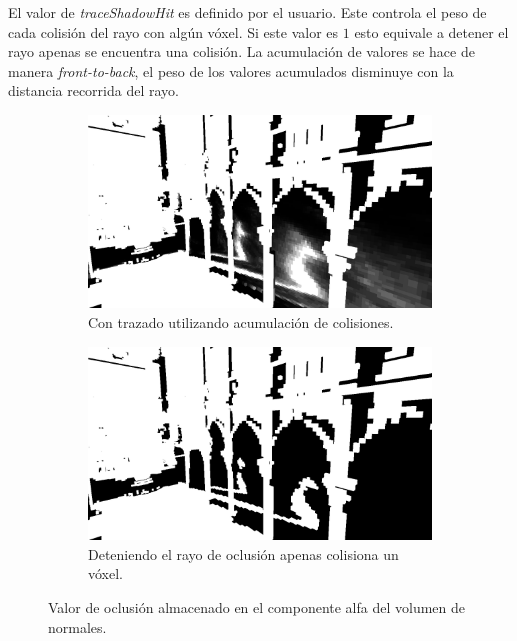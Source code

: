 El valor de \emph{traceShadowHit} es definido por el usuario. Este controla el peso de cada colisión del rayo con algún vóxel. Si este valor es $1$ esto equivale a detener el rayo apenas se encuentra una colisión. La acumulación de valores se hace de manera \emph{front-to-back}, el peso de los valores acumulados disminuye con la distancia recorrida del rayo.

\begin{figure}[H]
	\centering
	\begin{subfigure}[t]{0.49\textwidth}
		\centering
		\captionsetup{justification=centering}
		\includegraphics[width=\linewidth]{media/soft_traced.png}
		\caption*{Con trazado utilizando acumulación de colisiones.}
	\end{subfigure}%
	\hspace{0.01\textwidth}
	\begin{subfigure}[t]{0.49\textwidth}
		\centering
		\captionsetup{justification=centering}
		\includegraphics[width=\linewidth]{media/hard_traced.png}
		\caption*{Deteniendo el rayo de oclusión apenas colisiona un vóxel.}
	\end{subfigure}%
	\caption{Valor de oclusión almacenado en el componente alfa del volumen de normales.}
	\label{fig:vshadows_hit}
\end{figure}

